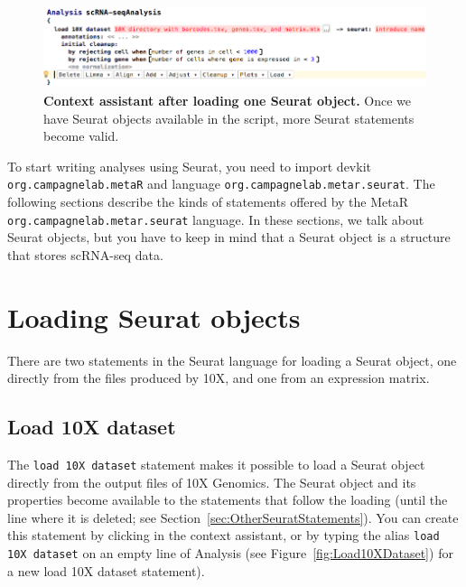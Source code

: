 \begin{figure}[h!tbp]
  \centering
  \includegraphics[width=\figWidthWide]{figures/ContextAssistantMid.png}
    \caption[Context assistant after loading one Seurat object.]{\textbf{Context
    assistant after loading one Seurat object.} Once we have Seurat objects
    available in the script, more Seurat statements become valid.}
\label{fig:ContextAssistantMid}
\end{figure}

To start writing analyses using Seurat, you need to import devkit
\texttt{org\allowbreak.campagne\allowbreak{}lab\allowbreak.metaR}
and language \texttt{org\allowbreak.campagne\allowbreak{}lab\allowbreak.metar\allowbreak.seurat}.
\noindent The following sections describe the kinds of statements offered by the MetaR
\texttt{org\allowbreak.campagne\allowbreak{}lab\allowbreak.metar\allowbreak.seurat} language.
In these sections, we talk about Seurat objects, but you have to keep in mind that a Seurat
object is a structure that stores scRNA-seq data.

\section{Loading Seurat objects}
There are two statements in the Seurat language for loading a Seurat object, one directly
from the files produced by 10X, and one from an expression matrix.

\subsection{Load 10X dataset}\label{subsec:Load10XDataset}
The \texttt{load 10X dataset} statement makes it possible to load a Seurat object directly
from the output files of 10X Genomics. The Seurat object and its properties become available
to the statements that follow the loading (until the line where it is deleted; see
Section~\ref{sec:OtherSeuratStatements}). You can create this statement by clicking
 in the context assistant, or by typing
the alias \texttt{load 10X dataset} on an empty line of Analysis (see Figure~\ref{fig:Load10XDataset})
for a new load 10X dataset statement).

